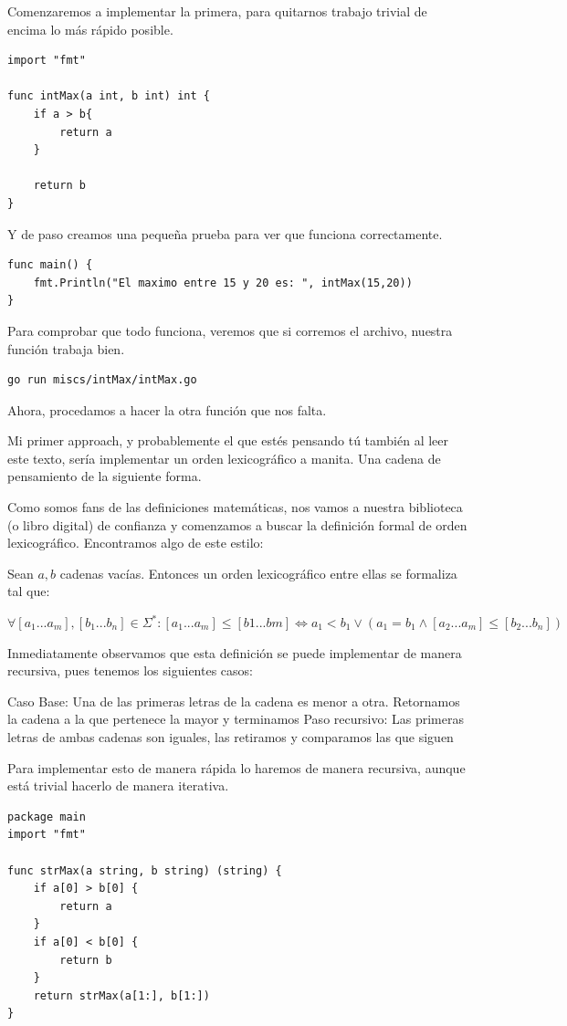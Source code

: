\documentclass[11pt]{article}
\begin{document}
Comenzaremos a implementar la primera, para quitarnos trabajo trivial de encima lo más rápido posible.

\begin{verbatim}
import "fmt"

func intMax(a int, b int) int {
	if a > b{
		return a
	}

	return b
}
\end{verbatim}

Y de paso creamos una pequeña prueba para ver que funciona correctamente.

\begin{verbatim}
func main() {
	fmt.Println("El maximo entre 15 y 20 es: ", intMax(15,20))
}
\end{verbatim}

Para comprobar que todo funciona, veremos que si corremos el archivo, nuestra función trabaja bien.
\begin{verbatim}
go run miscs/intMax/intMax.go
\end{verbatim}

Ahora, procedamos a hacer la otra función que nos falta.

Mi primer approach, y probablemente el que estés pensando tú también al leer este texto, sería implementar un orden lexicográfico a manita. Una cadena de pensamiento de la siguiente forma.

Como somos fans de las definiciones matemáticas, nos vamos a nuestra biblioteca (o libro digital) de confianza y comenzamos a buscar la definición formal de orden lexicográfico. Encontramos algo de este estilo:

Sean \(a, b\) cadenas vacías. Entonces un orden lexicográfico entre ellas se formaliza tal que:

\(\forall[a_1...a_m],[b_1...b_n]\in\Sigma^*:[a_1...a_m]\leq [b1...bm] \iff a_1 < b_1 \lor (a_1 = b_1 \land [a_2...a_m]\leq [b_2...b_n])\)

Inmediatamente observamos que esta definición se puede implementar de manera recursiva, pues tenemos los siguientes casos:

Caso Base: Una de las primeras letras de la cadena es menor a otra. Retornamos la cadena a la que pertenece la mayor y terminamos
Paso recursivo: Las primeras letras de ambas cadenas son iguales, las retiramos y comparamos las que siguen

Para implementar esto de manera rápida lo haremos de manera recursiva, aunque está trivial hacerlo de manera iterativa.

\begin{verbatim}
package main
import "fmt"

func strMax(a string, b string) (string) {
	if a[0] > b[0] {
		return a
	}
	if a[0] < b[0] {
		return b
	}
	return strMax(a[1:], b[1:])
}

\end{verbatim}
\end{document}

